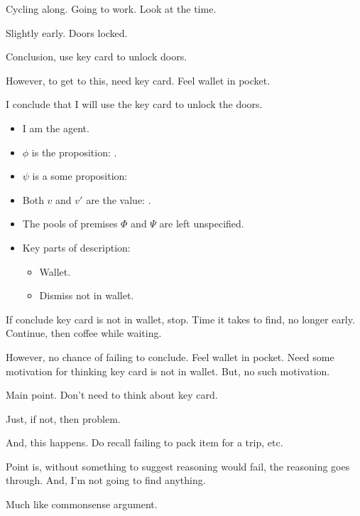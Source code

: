 \begin{note}
  \begin{illustration}%
    Cycling along.
    Going to work.
    Look at the time.

    Slightly early.
    Doors locked.

    Conclusion, use key card to unlock doors.

    However, to get to this, need key card.
    Feel wallet in pocket.

    I conclude that I will use the key card to unlock the doors.
  \end{illustration}

    \begin{itemize}[noitemsep]
  \item
    I am the agent.
  \item
    \(\phi\) is the proposition: .
  \item
    \(\psi\) is a some proposition: 
  \item
    Both \(v\) and \(v'\) are the value: .
  \item
    The pools of premises \(\Phi\) and \(\Psi\) are left unspecified.
  \item
    Key parts of description:
    \begin{itemize}
    \item
      Wallet.
    \item
      Dismiss not in wallet.
    \end{itemize}
  \end{itemize}

  If conclude key card is not in wallet, stop.
  Time it takes to find, no longer early.
  Continue, then coffee while waiting.

  However, no chance of failing to conclude.
  Feel wallet in pocket.
  Need some motivation for thinking key card is not in wallet.
  But, no such motivation.
\end{note}

\begin{note}
  Main point.
  Don't need to think about key card.

  Just, if not, then problem.

  And, this happens.
  Do recall failing to pack item for a trip, etc.

  Point is, without something to suggest reasoning would fail, the reasoning goes through.
  And, I'm not going to find anything.

  Much like commonsense argument.
\end{note}

